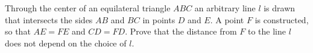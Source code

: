 \problem
Through the center of an equilateral triangle $ABC$ an arbitrary line $l$
is drawn that intersects the sides $AB$ and $BC$ in points $D$ and $E$.
A point $F$ is constructed, so that $AE = FE$ and $CD = FD$.
Prove that the distance from $F$ to the line $l$ does not depend on the
choice of $l$.
\solution
\endproblem
